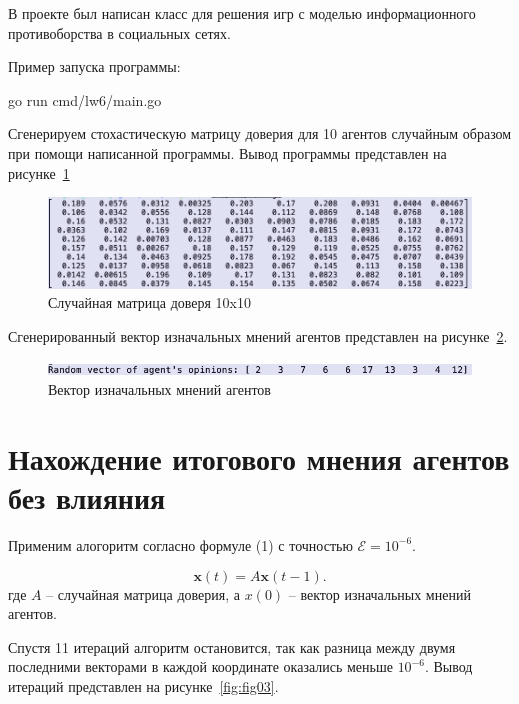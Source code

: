 
В проекте был написан класс для решения игр с моделью информационного противоборства в социальных сетях.

Пример запуска программы:

\begin{codelisting}[language=Bash]
    go run cmd/lw6/main.go
\end{codelisting}

Сгенерируем стохастическую матрицу доверия для 10 агентов
случайным образом при помощи написанной программы. Вывод программы представлен на рисунке~\ref{fig:fig01}

\begin{figure}
  \centering
  \includegraphics[scale=0.5]{../../artifacts/lw6/1.png}
  \caption{Случайная матрица доверя 10x10}
  \label{fig:fig01}
\end{figure}

Сгенерированный вектор изначальных мнений агентов представлен на рисунке~\ref{fig:fig02}.

\begin{figure}
  \centering
  \includegraphics[scale=0.6]{../../artifacts/lw6/2.png}
  \caption{Вектор изначальных мнений агентов}
  \label{fig:fig02}
\end{figure}

\section{Нахождение итогового мнения агентов без влияния}

Применим алогоритм согласно формуле (1) с точностью $\mathcal E = 10^{-6}$.

\begin{equation}
\mathbf{x}(t) = A \mathbf{x}(t - 1).
\end{equation}
где $A$ -- случайная матрица доверия, а $x(0)$ -- вектор изначальных мнений агентов.

Спустя 11 итераций алгоритм остановится, так как разница между двумя последними векторами в каждой
координате оказались меньше $10^{-6}$. Вывод итераций представлен на рисунке~\ref{fig:fig03}.

